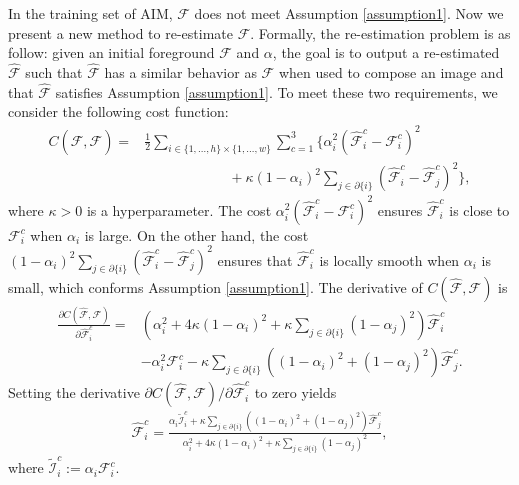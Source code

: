 \documentclass{article}
\theoremstyle{plain}
\begin{document}
In the training set of AIM, $\mathcal F$ does not meet Assumption \ref{assumption1}.
Now we present a new method to re-estimate $\mathcal F$.
Formally, the re-estimation problem is as follow:
given an initial foreground $\mathcal F$ and $\alpha$, the goal is to output a re-estimated $\hat {\mathcal F}$ such that 
$\hat {\mathcal F}$
has a similar behavior as
${\mathcal F}$ when used to compose an image
and
that 
$\hat {\mathcal F}$ satisfies Assumption \ref{assumption1}. 
To meet these two requirements, we consider the following cost function:
{\small
    \begin{align*}
    C(\hat {\mathcal F}, \mathcal F)
    =&
    \frac{1}{2}
    \sum_{i \in \{1, \ldots, h\} \times \{1, \ldots, w\}}
    \sum_{c=1}^3
    \Big\{
        \alpha_i^2 ( \hat {\mathcal F}_i^c - {\mathcal F}_i^c )^2
        \\
     &
     \quad\quad\quad
     \quad\quad\quad
    +
    \kappa
    (1 - \alpha_i)^2
        \sum\limits_{j \in \partial \{i\} } (\hat {\mathcal F}_i^c - \hat {\mathcal F}_j^c)^2
    \Big\}
    ,
\end{align*}
}where $\kappa > 0$ is a hyperparameter.
The cost
$
        \alpha_i^2 ( \hat {\mathcal F}_i^c - {\mathcal F}_i^c )^2
$
ensures $\hat {\mathcal F}_i^c$ is close to ${\mathcal F}_i^c $ when $\alpha_i$ is large.
On the other hand, the cost
$
    (1 - \alpha_i)^2
        \sum_{j \in \partial \{i\} } (\hat {\mathcal F}_i^c - \hat {\mathcal F}_j^c)^2
$
ensures that $\hat{\mathcal F}_i^c$ is locally smooth when $\alpha_i $ is small, which conforms Assumption \ref{assumption1}. 
The derivative of $C( \hat{\mathcal F}, \mathcal F)$ is
{\small
\begin{align*}
    \frac{\partial C (\hat {\mathcal F}, \mathcal F) }{\partial \hat {\mathcal F}_i^c} = &
    \left(
        \alpha_i^2 
    +
    4\kappa (1-\alpha_i)^2
    +
    \kappa \sum\limits_{j\in \partial \{i\}} (1-\alpha_j)^2 
\right)
\hat {\mathcal F}_i^c
    \\
    &
    -\alpha_i^2 \mathcal {\mathcal F}_i^c
    -
     \kappa {\sum\limits_{j \in \partial\{i\} }
         (
(1-\alpha_i)^2
+(1-\alpha_j)^2
)
     \hat {\mathcal F}_j^c }
     .
\end{align*}
}Setting
the derivative $\partial C (\hat{\mathcal F}, \mathcal F) / \partial \hat {\mathcal F}_i^c $ to zero yields
{\small
\begin{align*}
    \hat {\mathcal F}_i^c = 
    \frac{
        \alpha_i
        \mathcal {\tilde I}_i^c
        +
        \kappa
         \sum_{j \in \partial \{i\}} ((1-\alpha_i)^2 +(1 -\alpha_j)^2 ) \hat {\mathcal F}_j^c
    }{
        \alpha_i^2 + 
        4 \kappa (1 - \alpha_i)^2 + 
        \kappa \sum_{j\in \partial\{i\}} (1 - \alpha_j)^2
}
    ,
\end{align*}
}where $\mathcal {\tilde I}_i^c := \alpha_i \mathcal F_i^c$.
\end{document}
